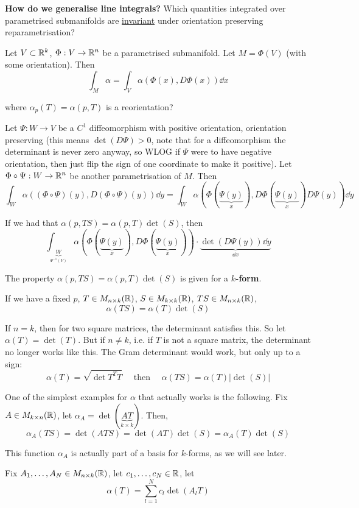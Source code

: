 \documentclass[12pt]{article}
\begin{document}
\textbf{How do we generalise line integrals?} Which quantities integrated over parametrised submanifolds are \underline{invariant} under orientation preserving reparametrisation?

Let $V \subset \mathbb{R}^k$, $\Phi: V \rightarrow \mathbb{R}^n$ be a parametrised submanifold. Let $M= \Phi(V)$ (with some orientation). Then
\[
    \int_M \alpha = \int_V \alpha \left( \Phi(x), D\Phi(x) \right) \dd x
\]

where $\alpha_p(T) = \alpha(p, T)$ is a reorientation?

Let $\Psi: W \rightarrow V$ be a $C^1$ diffeomorphism with positive orientation, orientation preserving (this means $\det(D \Psi) > 0$, note that for a diffeomorphism the determinant is never zero anyway, so WLOG if $\Psi$ were to have negative orientation, then just flip the sign of one coordinate to make it positive). Let $\Phi \circ \Psi: W \rightarrow \mathbb{R}^n$ be another parametrisation of $M$. Then
\[
    \int_W \alpha((\Phi \circ \Psi)(y), D(\Phi \circ \Psi)(y)) \dd y = \int_W \alpha(\Phi(\underbrace{\Psi(y)}_{x}), D\Phi(\underbrace{\Psi(y)}_{x})D\Psi(y)) \dd y
\]

If we had that $\alpha(p, TS) = \alpha(p, T) \det(S)$, then
\[
    \int_{\underbrace{W}_{\Psi^{-1}(V)}} \alpha(\Phi(\underbrace{\Psi(y)}_{x}), D\Phi(\underbrace{\Psi(y)}_{x})) \cdot \underbrace{\det(D\Psi(y)) \dd y}_{\dd x}
\]

The property $\alpha(p, TS) = \alpha(p, T) \det(S)$ is given for a \textbf{$k$-form}.

If we have a fixed $p$, $T \in M_{n \times k}(\mathbb{R})$, $S \in M_{k \times k}(\mathbb{R})$, $TS \in M_{n \times k}(\mathbb{R})$,
\[
    \alpha(TS) = \alpha(T) \det(S)
\]

If $n = k$, then for two square matrices, the determinant satisfies this. So let $\alpha(T) = \det(T)$. But if $n \neq k$, i.e. if $T$ is not a square matrix, the determinant no longer works like this. The Gram determinant would work, but only up to a sign:
\[
    \alpha(T) = \sqrt{\det T^TT} \quad\text{ then }\quad \alpha(TS) = \alpha(T) |\det(S)|
\]

One of the simplest examples for $\alpha$ that actually works is the following. Fix $A \in M_{k \times n}(\mathbb{R})$, let $\boxed{\alpha_A = \det(\underbrace{AT}_{k \times k})}$. Then,
\[
    \alpha_A(TS) = \det(ATS) = \det(AT)\det(S) = \alpha_A(T)\det(S)
\]

This function $\alpha_A$ is actually part of a basis for $k$-forms, as we will see later.

Fix $A_1,\dots,A_N \in  M_{n \times k}(\mathbb{R})$, let $c_1,\dots,c_N \in \mathbb{R}$, let 
\[
    \alpha(T) = \sum_{l = 1}^{N} c_l \det(A_l T)
\]
\end{document}
